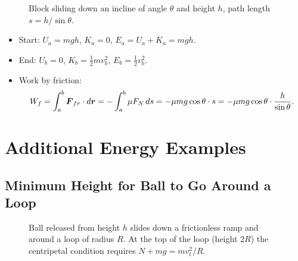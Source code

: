 \begin{example}
\begin{figure}[H]
    \centering
    \caption{Block sliding down an incline of angle $\theta$ and height $h$, path length $s = h/\sin\theta$.}
\end{figure}

\begin{itemize}
    \item Start: $U_a = mgh$, $K_a = 0$, $E_a = U_a + K_a = mgh$.
    \item End: $U_b = 0$, $K_b = \tfrac{1}{2}mv_b^2$, $E_b = \tfrac{1}{2}v_b^2$.
    \item Work by friction:
    \[
        W_f = \int_a^b \vect{F}_{fr}\cdot d\lvect{r} = -\int_a^b \mu F_N\,ds = -\mu mg\cos\theta \cdot s = -\mu mg\cos\theta \cdot \frac{h}{\sin\theta}.
    \]
\end{itemize}
\end{example}

\chapter{Additional Energy Examples}

\section{Minimum Height for Ball to Go Around a Loop}

\begin{figure}[H]
\begin{center}
\end{center}
\caption{Ball released from height $h$ slides down a frictionless ramp and around a loop of radius $R$. At the top of the loop (height $2R$) the centripetal condition requires $N + mg = mv_t^2/R$.}
\label{fig:loop_the_loop}
\end{figure}

